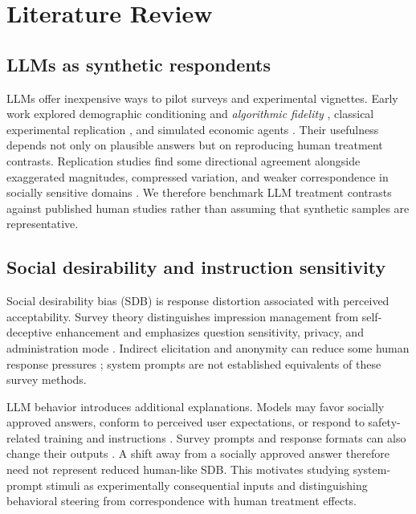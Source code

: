 \section{Literature Review}

\subsection{LLMs as synthetic respondents}

LLMs offer inexpensive ways to pilot surveys and experimental vignettes. Early work explored demographic conditioning and \emph{algorithmic fidelity} \cite{argyle2023}, classical experimental replication \cite{aher2023}, and simulated economic agents \cite{horton2023}. Their usefulness depends not only on plausible answers but on reproducing human treatment contrasts. Replication studies find some directional agreement alongside exaggerated magnitudes, compressed variation, and weaker correspondence in socially sensitive domains \cite{cui2025,bisbee2024,santurkar2023,rottger2024}. We therefore benchmark LLM treatment contrasts against published human studies rather than assuming that synthetic samples are representative.

\subsection{Social desirability and instruction sensitivity}

Social desirability bias (SDB) is response distortion associated with perceived acceptability. Survey theory distinguishes impression management from self-deceptive enhancement and emphasizes question sensitivity, privacy, and administration mode \cite{crowne1960,paulhus1984,tourangeau2007,krumpal2013}. Indirect elicitation and anonymity can reduce some human response pressures \cite{nederhof1985,horiuchi2022}; system prompts are not established equivalents of these survey methods.

LLM behavior introduces additional explanations. Models may favor socially approved answers, conform to perceived user expectations, or respond to safety-related training and instructions \cite{salecha2024,sharma2023}. Survey prompts and response formats can also change their outputs \cite{tjuatja2024}. A shift away from a socially approved answer therefore need not represent reduced human-like SDB. This motivates studying system-prompt stimuli as experimentally consequential inputs and distinguishing behavioral steering from correspondence with human treatment effects.

